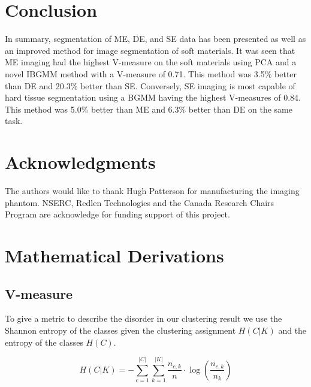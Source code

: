\documentclass[a4paper,11pt]{article}
\begin{document}
\section{Conclusion}

In summary, segmentation of ME, DE, and SE data has been presented as well as an improved method for image segmentation of soft materials. It was seen that ME imaging had the highest V-measure on the soft materials using PCA and a novel IBGMM method with a V-measure of 0.71. This method was 3.5\% better than DE and 20.3\% better than SE. Conversely, SE imaging is most capable of hard tissue segmentation using a BGMM having the highest V-measures of 0.84. This method was 5.0\% better than ME and 6.3\% better than DE on the same task.


\section*{Acknowledgments}

The authors would like to thank Hugh Patterson for manufacturing the imaging phantom. NSERC, Redlen Technologies and the Canada Research Chairs Program are acknowledge for funding support of this project.

\appendix{}
\section{Mathematical Derivations}

\subsection{V-measure}

To give a metric to describe the disorder in our clustering result we use the Shannon entropy of the classes given the clustering assignment $H(C|K)$ and the entropy of the classes  $H(C)$.

\begin{equation}
H(C|K) = - \sum_{c=1}^{|C|} \sum_{k=1}^{|K|} \frac{n_{c,k}}{n}
\cdot \log\left(\frac{n_{c,k}}{n_k}\right)
\end{equation}
\end{document}
